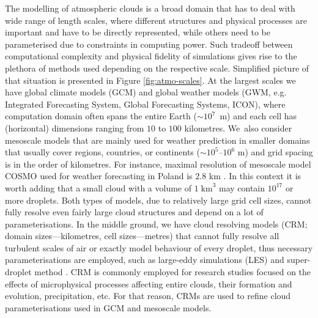 \documentclass{pracamgren}
\begin{document}
The modelling of atmospheric clouds is a broad domain that has to deal with wide range of length scales, where different structures and physical processes are important and have to be directly represented, while others need to be parameterised due to constraints in computing power.
Such tradeoff between computational complexity and physical fidelity of simulations gives rise to the plethora of methods used depending on the respective scale.
Simplified picture of that situation is presented in Figure \ref{fig:atmo-scales}.
At the largest scales we have global climate models (GCM) and global weather models (GWM, e.g. Integrated Forecasting System, Global Forecasting Systems, ICON), where computation domain  often spans the entire Earth (${\sim 10^{7}}$~m) and each cell has (horizontal) dimensions ranging from $10$ to $100$ kilometres.
We~also consider mesoscale models that are mainly used for weather prediction in smaller domains that usually cover regions, countries, or continents ($\sim 10^{5} \text{--} 10^{6}$ m) and grid spacing is in the order of kilometres.
For instance, maximal resolution of mesoscale model COSMO used for weather forecasting in Poland is $2.8$ km \parencite{Doms2021}.
In this context it is worth adding that a small cloud with a volume of $1 \; \text{km}^3$ may contain $10^{17}$ or more droplets.
Both types of models, due to relatively large grid cell sizes, cannot fully resolve even fairly large cloud structures and depend on a lot of parameterisations.
In the middle ground, we have cloud resolving models (CRM; domain sizes---kilometres, cell sizes---metres) that cannot fully resolve all turbulent scales of air or exactly model behaviour of every droplet, thus necessary parameterisations are employed, such as large-eddy simulations (LES) and super-droplet method \parencite{Arabas2013}.
CRM is commonly employed for research studies focused on the effects of microphysical processes affecting entire clouds, their formation and evolution, precipitation, etc.
For that reason, CRMs are used to refine cloud parameterisations used in GCM and mesoscale models.
\end{document}
